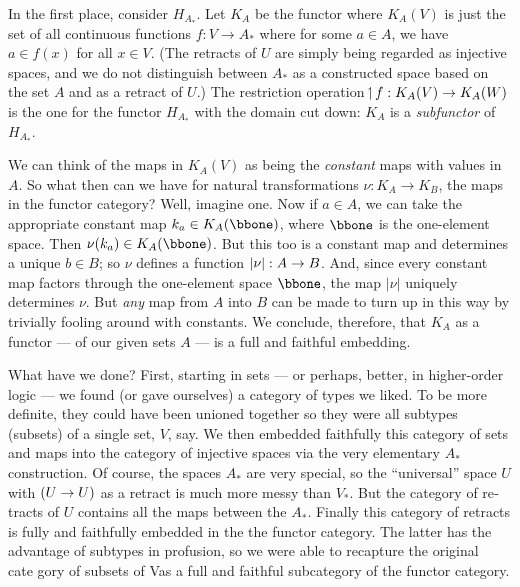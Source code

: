 In the first place, consider $H_{A_*}$.	Let $K_A$ be the functor where $K_A(V)$ is just the set of all continuous functions
$f: V\to A_*$ where for some $a \in A$, we have $a \in f(x)$ for all $x \in V$. (The retracts of $U$ are simply being regarded as injective spaces, and we do not distinguish between $A_*$ as a constructed space based on the set $A$ and as a retract of $U$.) The restric­tion operation 
$\!\upharpoonleft\! f : K_A(V)\rightarrow K_A(W)$
is the one for the functor $H_{A_*}$ with the domain cut down: $K_A$ is a {\it subfunctor} of $H_{A_*}$.

We can think of the maps in $K_A(V)$ as being the {\it constant} maps with
values in $A$. So what then can we have for natural transformations $\nu: K_A \to K_B$, the maps in the functor category? Well, imagine one. Now if $a \in A$, we can take the appropriate con­stant map $k_a \in K_A(\bbone)$, where $\bbone$ is the one-element space. Then $\nu(k_a) \in K_A(\bbone)$.
But this too is a constant map and determines a unique $b \in B$; so $\nu$ defines a function $|\nu| : A \rightarrow B$. And, since every constant map factors through the one-element space $\bbone$, the map $|\nu|$ uniquely determines $\nu$. But {\it any} map from $A$ into $B$ can
be made to turn up in this way by trivially fooling around with constants. We conclude, therefore, that $K_A$ as a functor --- of our given sets $A$ --- is a full and faithful embedding.

What have we done? First, starting in sets --- or perhaps, better, in higher-order logic --- we found (or gave ourselves) a category of types we liked. To be more definite, they could
have been unioned together so they were all subtypes (subsets) of a single set, $V$, say. We then embedded faithfully this category of sets and maps into the category of injective spaces via the very elementary $A_*$ construction. Of course, the spaces $A_*$ are very special, so the ``universal'' space $U$ with $(U\rightarrow U)$ as a retract is much more messy than $V_*$. But the category of re­tracts of $U$ contains all the maps between the $A_*$. Finally this category of retracts is fully and faithfully embedded in the the functor category. The latter has the advantage of subtypes in profusion, so we were able to recapture the original cate­ gory of subsets of Vas a full and faithful subcategory of the functor category.

